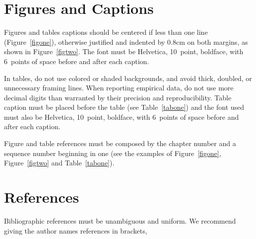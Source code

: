 \documentclass{SBCbookchapter}
\begin{document}
\section{Figures and Captions}
\label{sec:captionmargins}
Figures and tables captions should be centered if less than one line
(Figure~\ref{figone}), otherwise justified and indented by 0.8cm on
both margins, as shown in Figure~\ref{figtwo}. The font must be
Helvetica, 10~point, boldface, with 6~points of space before and after
each caption.



In tables, do not use colored or shaded backgrounds, and avoid thick,
doubled, or unnecessary framing lines. When reporting empirical data,
do not use more decimal digits than warranted by their precision and
reproducibility. Table caption must be placed before the table (see
Table~\ref{tabone}) and the font used must also be Helvetica,
10~point, boldface, with 6~points of space before and after each
caption.

Figure and table references must be composed by the chapter number and
a sequence number beginning in one (see the examples of
Figure~\ref{figone}, Figure~\ref{figtwo} and Table~\ref{tabone}).




\section{References}
Bibliographic references must be unambiguous and uniform.  We
recommend giving the author names references in brackets,


\end{document}
